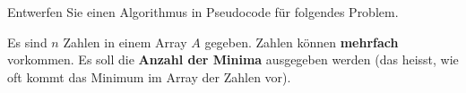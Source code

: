 %
%
Entwerfen Sie einen Algorithmus in Pseudocode für folgendes Problem.

\begin{problem}\label{problem-anzahl-minima-n-zahlen}
	Es sind $n$ Zahlen in einem Array $A$ gegeben. Zahlen können \textbf{mehrfach} vorkommen. Es soll die \textbf{Anzahl der Minima} ausgegeben werden (das heisst, wie oft kommt das Minimum im Array der Zahlen vor).
\end{problem}

